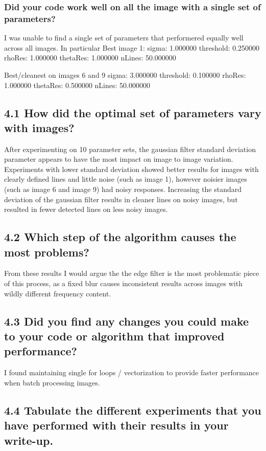 \documentclass[12pt]{article}
\begin{document}
\subsubsection{Did your code work well on all the image with a single set of parameters? }

I was unable to find a single set of parameters that performered equally well across all images. In particular
Best image 1:
sigma: 1.000000
threshold: 0.250000
rhoRes: 1.000000
thetaRes: 1.000000
nLines: 50.000000

Best/cleanest on images 6 and 9
sigma: 3.000000
threshold: 0.100000
rhoRes: 1.000000
thetaRes: 0.500000
nLines: 50.000000

\subsection{4.1 How did the optimal set of parameters vary with images? }
After experimenting on 10 parameter sets, the gaussian filter standard deviation parameter appears to have the most impact on image to image variation. Experiments with lower standard deviation showed better results for images with clearly defined lines and little noise (such as image 1), however noisier images (such as image 6 and image 9) had noisy responses.
Increasing the standard deviation of the gaussian filter results in cleaner lines on noisy images, but resulted in fewer detected lines on less noisy images.

\subsection{4.2 Which step of the algorithm causes the most problems? }
From these results I would argue the the edge filter is the most problematic piece of this process, as a fixed blur causes inconsistent results across images with wildly different frequency content.

\subsection{4.3 Did you find any changes you could make to your code or algorithm that improved performance?}
I found maintaining single for loops / vectorization to provide faster performance when batch processing images.

\subsection{4.4 Tabulate the different experiments that you have performed with their results in your write-up.}
\end{document}
